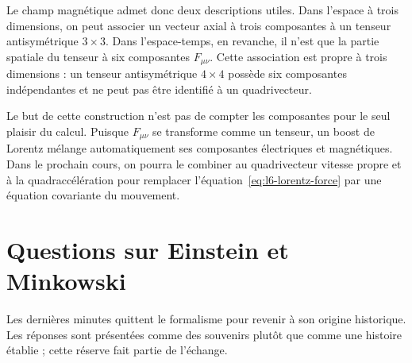 Le champ magnétique admet donc deux descriptions utiles. Dans l’espace à trois dimensions, on peut associer un vecteur axial à trois composantes à un tenseur antisymétrique \(3\times3\). Dans l’espace-temps, en revanche, il n’est que la partie spatiale du tenseur à six composantes \(F_{\mu\nu}\). Cette association est propre à trois dimensions : un tenseur antisymétrique \(4\times4\) possède six composantes indépendantes et ne peut pas être identifié à un quadrivecteur. 

Le but de cette construction n’est pas de compter les composantes pour le seul plaisir du calcul. Puisque \(F_{\mu\nu}\) se transforme comme un tenseur, un boost de Lorentz mélange automatiquement ses composantes électriques et magnétiques. Dans le prochain cours, on pourra le combiner au quadrivecteur vitesse propre et à la quadraccélération pour remplacer l’équation~\eqref{eq:l6-lorentz-force} par une équation covariante du mouvement.

\section{Questions sur Einstein et Minkowski}

Les dernières minutes quittent le formalisme pour revenir à son origine historique. Les réponses sont présentées comme des souvenirs plutôt que comme une histoire établie ; cette réserve fait partie de l’échange.

\begin{classroomqa}\end{classroomqa}

